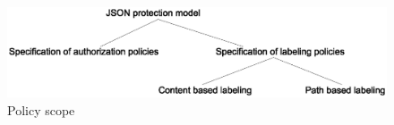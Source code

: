  
 	\begin{figure} [t]
 		\centering
 		\includegraphics[width=1\textwidth]{NSS16/administration-scope}
 		\caption{Policy scope}
 		\label{fig:administration-scope}
 	\end{figure}
 